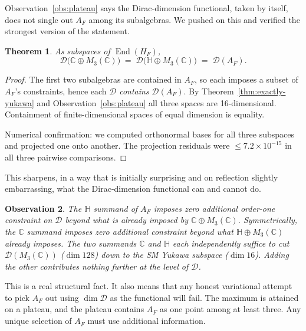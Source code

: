 \documentclass[11pt,a4paper]{article}
\newtheorem{theorem}{Theorem}
\newtheorem{observation}[theorem]{Observation}
\begin{document}
Observation~\ref{obs:plateau} says the Dirac-dimension functional, taken by
itself, does not single out $A_F$ among its subalgebras. We pushed on this and
verified the strongest version of the statement.

\begin{theorem}\label{thm:subspaces-equal}
As subspaces of $\operatorname{End}(H_F)$,
\[
  \mathcal{D}\big(\mathbb{C} \oplus M_3(\mathbb{C})\big)
  \;=\;
  \mathcal{D}\big(\mathbb{H} \oplus M_3(\mathbb{C})\big)
  \;=\;
  \mathcal{D}(A_F).
\]
\end{theorem}

\begin{proof}
The first two subalgebras are contained in $A_F$, so each imposes a subset of
$A_F$'s constraints, hence each $\mathcal{D}$ \emph{contains} $\mathcal{D}(A_F)$.
By Theorem~\ref{thm:exactly-yukawa} and Observation~\ref{obs:plateau} all three
spaces are 16-dimensional. Containment of finite-dimensional spaces of equal
dimension is equality.

Numerical confirmation: we computed orthonormal bases for all three subspaces
and projected one onto another. The projection residuals were
$\le 7.2 \times 10^{-15}$ in all three pairwise comparisons.
\end{proof}

This sharpens, in a way that is initially surprising and on reflection slightly
embarrassing, what the Dirac-dimension functional can and cannot do.

\begin{observation}\label{obs:redundancy}
The $\mathbb{H}$ summand of $A_F$ imposes zero additional order-one constraint
on $\mathcal{D}$ beyond what is already imposed by $\mathbb{C} \oplus M_3(\mathbb{C})$.
Symmetrically, the $\mathbb{C}$ summand imposes zero additional constraint
beyond what $\mathbb{H} \oplus M_3(\mathbb{C})$ already imposes. The two
summands $\mathbb{C}$ and $\mathbb{H}$ each independently suffice to cut
$\mathcal{D}(M_3(\mathbb{C}))$ ($\dim 128$) down to the SM Yukawa subspace
($\dim 16$). Adding the other contributes nothing further at the level of
$\mathcal{D}$.
\end{observation}

This is a real structural fact. It also means that any honest variational
attempt to pick $A_F$ out using $\dim \mathcal{D}$ as the functional will fail.
The maximum is attained on a plateau, and the plateau contains $A_F$ as one
point among at least three. Any unique selection of $A_F$ must use additional
information.
\end{document}
